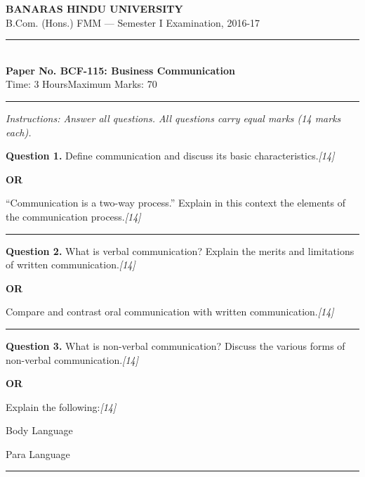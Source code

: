 \documentclass[11pt,a4paper]{article}
\newcommand{\pts}[1]{\hfill   \textit{[#1]}}
\begin{document}
\begin{center}
  {\large\bfseries BANARAS HINDU UNIVERSITY}\\[2pt]
  {\normalsize B.Com. (Hons.) FMM --- Semester I Examination, 2016-17}\\[6pt]
  \rule{0.8\linewidth}{0.5pt}\\[6pt]
  {\large\bfseries Paper No. BCF-115: Business Communication}\\[4pt]
  {\normalsize Time: 3 Hours\hfill Maximum Marks: 70}
\end{center}

\rule{\linewidth}{0.4pt}

\smallskip



\noindent   \textit{Instructions: Answer all questions. All questions carry equal marks (14 marks each).}

\bigskip




\noindent   \textbf{Question 1.}
Define communication and discuss its basic characteristics.\pts{14}

\centerline{   \textbf{OR}}

``Communication is a two-way process.'' Explain in this context the elements of the communication process.\pts{14}

\medskip\rule{\linewidth}{0.2pt}




\noindent   \textbf{Question 2.}
What is verbal communication? Explain the merits and limitations of written communication.\pts{14}

\centerline{   \textbf{OR}}

Compare and contrast oral communication with written communication.\pts{14}

\medskip\rule{\linewidth}{0.2pt}




\noindent   \textbf{Question 3.}
What is non-verbal communication? Discuss the various forms of non-verbal communication.\pts{14}

\centerline{   \textbf{OR}}

Explain the following:\pts{14}

\begin{parts}
  \item Body Language
  \item Para Language
\end{parts}

\medskip\rule{\linewidth}{0.2pt}
\end{document}
